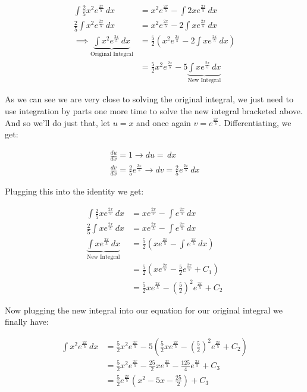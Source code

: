 \documentclass{article}
\begin{document}
\begin{align*}
    \int \frac{2}{5}x^2e^{\frac{2x}{5}}\,dx&=x^2e^{\frac{2x}{5}}-\int 2xe^{\frac{2x}{5}}\,dx\\
    \frac{2}{5}\int x^2e^{\frac{2x}{5}}\,dx&=x^2e^{\frac{2x}{5}}-2\int xe^{\frac{2x}{5}}\,dx\\
    \implies\underbrace{\int x^2e^{\frac{2x}{5}}\,dx}_{\text{Original Integral}}&=\frac{5}{2}(x^2e^{\frac{2x}{5}}-2\int xe^{\frac{2x}{5}}\,dx)\\
    &=\frac{5}{2}x^2e^{\frac{2x}{5}}-5\underbrace{\int xe^{\frac{2x}{5}}\,dx}_{\text{New Integral}}
\end{align*}

As we can see we are very close to solving the original integral, we just need to use integration by parts one more time to solve the new integral bracketed above. And so we'll do just that, let $u=x$ and once again $v=e^{\frac{2x}{5}}$. Differentiating, we get:

\begin{gather*}
    \frac{du}{dx}=1\rightarrow du=\,dx\\
    \frac{dv}{dx}=\frac{2}{5}e^{\frac{2x}{5}}\rightarrow dv=\frac{2}{5}e^{\frac{2x}{5}}\,dx
\end{gather*}

Plugging this into the identity we get:

\begin{align*}
    \int \frac{2}{5}xe^{\frac{2x}{5}}\,dx&=xe^{\frac{2x}{5}}-\int e^{\frac{2x}{5}}\,dx\\
    \frac{2}{5}\int xe^{\frac{2x}{5}}\,dx&=xe^{\frac{2x}{5}}-\int e^{\frac{2x}{5}}\,dx\\
    \underbrace{\int xe^{\frac{2x}{5}}\,dx}_{\text{New Integral}}&=\frac{5}{2}(xe^{\frac{2x}{5}}-\int e^{\frac{2x}{5}}\,dx)\\
    &=\frac{5}{2}(xe^{\frac{2x}{5}}-\frac{5}{2}e^{\frac{2x}{5}}+C_1)\\
    &=\frac{5}{2}xe^{\frac{2x}{5}}-\left(\frac{5}{2}\right)^2e^{\frac{2x}{5}}+C_2
\end{align*}

Now plugging the new integral into our equation for our original integral we finally have:

\begin{align*}
    \int x^2e^{\frac{2x}{5}}\,dx&=\frac{5}{2}x^2e^{\frac{2x}{5}}-5\left(\frac{5}{2}xe^{\frac{2x}{5}}-\left(\frac{5}{2}\right)^2e^{\frac{2x}{5}}+C_2\right)\\
    &=\frac{5}{2}x^2e^{\frac{2x}{5}}-\frac{25}{2}xe^{\frac{2x}{5}}-\frac{125}{4}e^{\frac{2x}{5}}+C_3\\
    &=\frac{5}{2}e^{\frac{2x}{5}}\left(x^2-5x-\frac{25}{2}\right)+C_3
\end{align*}
\end{document}
